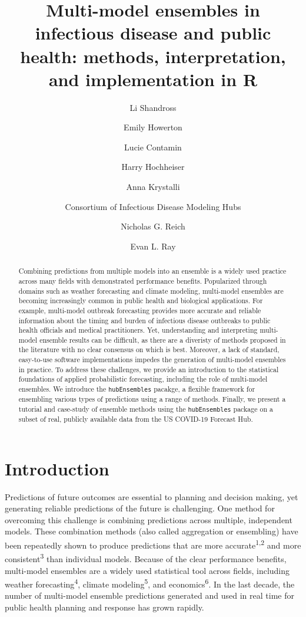 \documentclass[
  letterpaper,
  DIV=11,
  numbers=noendperiod]{scrartcl}
\title{Multi-model ensembles in infectious disease and public health:
methods, interpretation, and implementation in R}
\author{Li Shandross \and Emily Howerton \and Lucie Contamin \and Harry
Hochheiser \and Anna Krystalli \and Consortium of Infectious Disease
Modeling Hubs \and Nicholas G. Reich \and Evan L. Ray}
\date{}
\begin{document}
\maketitle
\begin{abstract}
Combining predictions from multiple models into an ensemble is a widely
used practice across many fields with demonstrated performance benefits.
Popularized through domains such as weather forecasting and climate
modeling, multi-model ensembles are becoming increasingly common in
public health and biological applications. For example, multi-model
outbreak forecasting provides more accurate and reliable information
about the timing and burden of infectious disease outbreaks to public
health officials and medical practitioners. Yet, understanding and
interpreting multi-model ensemble results can be difficult, as there are
a diveristy of methods proposed in the literature with no clear
consensus on which is best. Moreover, a lack of standard, easy-to-use
software implementations impedes the generation of multi-model ensembles
in practice. To address these challenges, we provide an introduction to
the statistical foundations of applied probabilistic forecasting,
including the role of multi-model ensembles. We introduce the
\texttt{hubEnsembles} pacakge, a flexible framework for ensembling
various types of predictions using a range of methods. Finally, we
present a tutorial and case-study of ensemble methods using the
\texttt{hubEnsembles} package on a subset of real, publicly available
data from the US COVID-19 Forecast Hub.
\end{abstract}

\section{Introduction}\label{sec-intro}

Predictions of future outcomes are essential to planning and decision
making, yet generating reliable predictions of the future is
challenging. One method for overcoming this challenge is combining
predictions across multiple, independent models. These combination
methods (also called aggregation or ensembling) have been repeatedly
shown to produce predictions that are more accurate\textsuperscript{1,2}
and more consistent\textsuperscript{3} than individual models. Because
of the clear performance benefits, multi-model ensembles are a widely
used statistical tool across fields, including weather
forecasting\textsuperscript{4}, climate modeling\textsuperscript{5}, and
economics\textsuperscript{6}. In the last decade, the number of
multi-model ensemble predictions generated and used in real time for
public health planning and response has grown rapidly.
\end{document}
